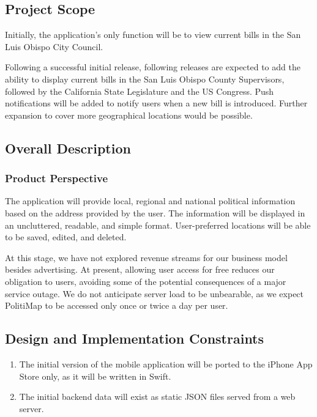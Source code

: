 \subsection{Project Scope}
Initially, the application's only function will be to view current
bills in the San Luis Obispo City Council.

Following a successful initial release, following releases are
expected to add the ability to display current bills in the San Luis
Obispo County Supervisors, followed by the California State
Legislature and the US Congress. Push notifications will be added to
notify users when a new bill is introduced. Further expansion to
cover more geographical locations would be possible.

\subsection{Overall Description}
\subsubsection{Product Perspective}
The application will provide local, regional and national political
information based on the address provided by the user. The information
will be displayed in an uncluttered, readable, and simple format.
User-preferred locations will be able to be saved, edited, and deleted.

At this stage, we have not explored revenue streams for our business
model besides advertising. At present, allowing user access for free
reduces our obligation to users, avoiding some of the potential
consequences of a major service outage. We do not anticipate server
load to be unbearable, as we expect PolitiMap to be accessed only once
or twice a day per user.

\subsection{Design and Implementation Constraints}
\begin{enumerate}
\item The initial version of the mobile application will be ported to
the iPhone App Store only, as it will be written in Swift.
\item The initial backend data will exist as static JSON files
  served from a web server.
\end{enumerate}

% 
